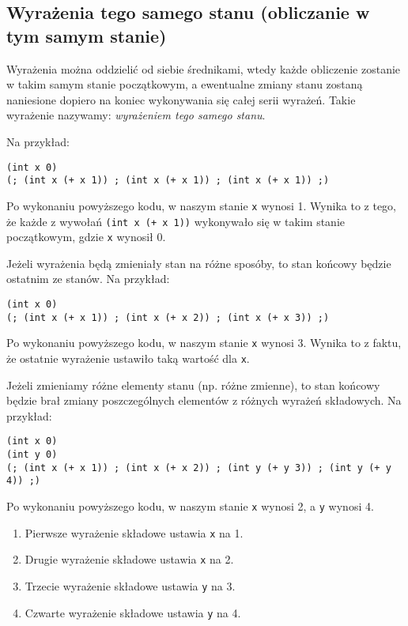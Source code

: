 \documentclass{article}
\begin{document}
\subsection{Wyrażenia tego samego stanu (obliczanie w tym samym stanie)}\label{same-state}

Wyrażenia można oddzielić od siebie średnikami, wtedy każde obliczenie zostanie w takim samym stanie początkowym, a ewentualne zmiany stanu zostaną naniesione dopiero na koniec wykonywania się całej serii wyrażeń. Takie wyrażenie nazywamy: \textit{wyrażeniem tego samego stanu}.

Na przykład:

\begin{lstlisting}
(int x 0)
(; (int x (+ x 1)) ; (int x (+ x 1)) ; (int x (+ x 1)) ;)
\end{lstlisting}

Po wykonaniu powyższego kodu, w naszym stanie \texttt{x} wynosi 1. Wynika to z tego, że każde z wywołań \texttt{(int x (+ x 1))} wykonywało się w takim stanie początkowym, gdzie \texttt{x} wynosił 0.

Jeżeli wyrażenia będą zmieniały stan na różne sposóby, to stan końcowy będzie ostatnim ze stanów. Na przykład:

\begin{lstlisting}
(int x 0)
(; (int x (+ x 1)) ; (int x (+ x 2)) ; (int x (+ x 3)) ;)
\end{lstlisting}

Po wykonaniu powyższego kodu, w naszym stanie \texttt{x} wynosi 3. Wynika to z faktu, że ostatnie wyrażenie ustawiło taką wartość dla \texttt{x}.

Jeżeli zmieniamy różne elementy stanu (np. różne zmienne), to stan końcowy będzie brał zmiany poszczególnych elementów z różnych wyrażeń składowych. Na przykład:

\begin{lstlisting}
(int x 0)
(int y 0)
(; (int x (+ x 1)) ; (int x (+ x 2)) ; (int y (+ y 3)) ; (int y (+ y 4)) ;)
\end{lstlisting}

Po wykonaniu powyższego kodu, w naszym stanie \texttt{x} wynosi 2, a \texttt{y} wynosi 4.

\begin{enumerate}
    \item Pierwsze wyrażenie składowe ustawia \texttt{x} na 1.
    \item Drugie wyrażenie składowe ustawia \texttt{x} na 2.
    \item Trzecie wyrażenie składowe ustawia \texttt{y} na 3.
    \item Czwarte wyrażenie składowe ustawia \texttt{y} na 4.
\end{enumerate}
\end{document}
